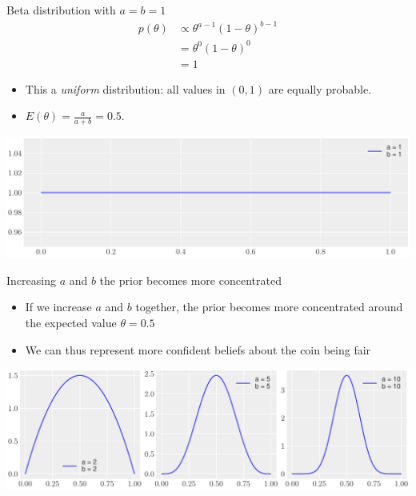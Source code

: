 \documentclass[
  13pt,
  ignorenonframetext,
]{beamer}
\providecommand{\tightlist}{%
  \setlength{\itemsep}{0pt}\setlength{\parskip}{0pt}}
\begin{document}
\begin{frame}{Beta distribution with \(a = b = 1\)}
\protect\hypertarget{beta-distribution-with-a-b-1}{}
\begin{align*}
p(\theta) & \propto \theta^{a-1}(1-\theta)^ {b-1} \\
& =   \theta^{0}(1-\theta)^ {0} \\
& = 1
\end{align*}

\begin{itemize}
\tightlist
\item
  This a \emph{uniform} distribution: all values in \((0,1)\) are
  equally probable.
\item
  \(E(\theta)=\frac{a}{a+b} = 0.5\).
\end{itemize}

\begin{center}\includegraphics{3-coinTossing_files/figure-beamer/unnamed-chunk-2-1} \end{center}
\end{frame}

\begin{frame}{Increasing \(a\) and \(b\) the prior becomes more
concentrated}
\protect\hypertarget{increasing-a-and-b-the-prior-becomes-more-concentrated}{}
\begin{itemize}
\item
  If we increase \(a\) and \(b\) together, the prior becomes more
  concentrated around the expected value \(\theta=0.5\)
\item
  We can thus represent more confident beliefs about the coin being fair
\end{itemize}

\begin{center}\includegraphics{3-coinTossing_files/figure-beamer/unnamed-chunk-3-3} \end{center}
\end{frame}
\end{document}
